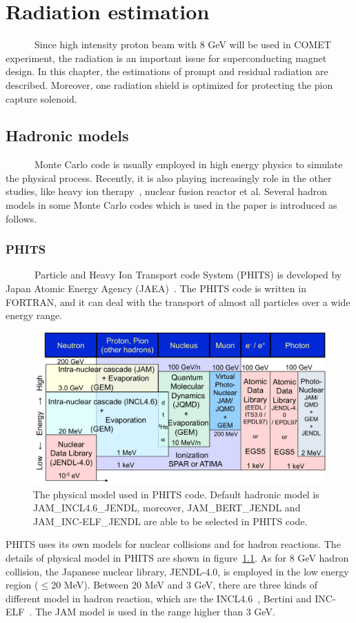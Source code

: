 \chapter{Radiation estimation}
~~~~~~Since high intensity proton beam with 8 GeV will be used in COMET experiment, the radiation is an important issue for superconducting magnet design.
In this chapter, the estimations of prompt and residual radiation are described.
Moreover, one radiation shield is optimized for protecting the pion capture solenoid.

 \section{Hadronic models}
~~~~~~Monte Carlo code is usually employed in high energy physics to simulate the physical process.
Recently, it is also playing increasingly role in the other studies, like heavy ion therapy~\cite{therapy}, nuclear fusion reactor et al.
Several hadron models in some Monte Carlo codes which is used in the paper is introduced as follows.

  \subsection{PHITS}
~~~~~~Particle and Heavy Ion Transport code System (PHITS) is developed by Japan Atomic Energy Agency (JAEA)~\cite{phits}.
The PHITS code is written in FORTRAN, and it can deal with the transport of almost all particles over a wide energy range. 
\begin{figure}[H]
 \centering
 \includegraphics[scale=0.43]{chapter3/fig/physicalmodel.pdf}
 \caption{The physical model used in PHITS code. Default hadronic model is JAM\_INCL4.6\_JENDL, moreover, JAM\_BERT\_JENDL and JAM\_INC-ELF\_JENDL are able to be selected in PHITS code.}
 \label{phitsmodel}
\end{figure}
PHITS uses its own models for nuclear collisions and for hadron reactions.
The details of physical model in PHITS are shown in figure~\ref{phitsmodel}.
As for 8 GeV hadron collision, the Japanese nuclear library, JENDL-4.0, is employed in the low energy region ($\le$20 MeV).
Between 20 MeV and 3 GeV, there are three kinds of different model in hadron reaction, which are the INCL4.6~\cite{incl}, Bertini and INC-ELF~\cite{incelf}.
The JAM model is used in the range higher than 3 GeV.

